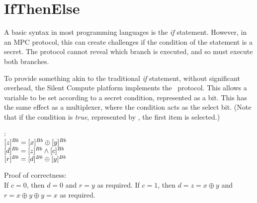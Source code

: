 \section{IfThenElse}

A basic syntax in most programming languages is the \textit{if} statement.
However, in an MPC protocol, this can create challenges if the
condition of the statement is a secret.
The protocol cannot reveal which branch is executed, and so must
execute both branches.

To provide something akin to the traditional \textit{if} statement,
without significant overhead,
the Silent Compute platform implements the \IfThenElseZ~protocol.
This allows a variable to be set according to a secret condition,
represented as a bit.
This has the same effect as a multiplexer, where the
condition acts as the select bit.
(Note that if the condition is \emph{true}, represented by ,
the first item is selected.)

\begin{protocol}

	:\\
	\indent $[z]^{Bb} = [x]^{Bb} \oplus [y]^{Bb} $ \\
	\indent $[d]^{Bb} = [z]^{Bb} \wedge [c]^{Bb} $ \\	
	\indent $[r]^{Bb} = [d]^{Bb} \oplus [y]^{Bb} $\\

\end{protocol}

Proof of correctness:\\
If $c = 0$, then $d = 0$ and $r = y$ as required.
If $c = 1$, then $d = z = x \oplus y$ and $r = x \oplus y \oplus y = x$ as required.


